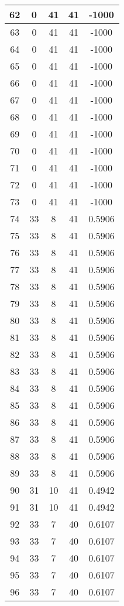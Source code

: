 \documentclass[letterpaper, 12pt]{article}
\begin{document}
\begin{longtable}{|c|c|c|c|c|}
\hline
62 & 0 & 41 & 41 & -1000 \\
\hline
63 & 0 & 41 & 41 & -1000 \\
\hline
64 & 0 & 41 & 41 & -1000 \\
\hline
65 & 0 & 41 & 41 & -1000 \\
\hline
66 & 0 & 41 & 41 & -1000 \\
\hline
67 & 0 & 41 & 41 & -1000 \\
\hline
68 & 0 & 41 & 41 & -1000 \\
\hline
69 & 0 & 41 & 41 & -1000 \\
\hline
70 & 0 & 41 & 41 & -1000 \\
\hline
71 & 0 & 41 & 41 & -1000 \\
\hline
72 & 0 & 41 & 41 & -1000 \\
\hline
73 & 0 & 41 & 41 & -1000 \\
\hline
74 & 33 & 8 & 41 & 0.5906 \\
\hline
75 & 33 & 8 & 41 & 0.5906 \\
\hline
76 & 33 & 8 & 41 & 0.5906 \\
\hline
77 & 33 & 8 & 41 & 0.5906 \\
\hline
78 & 33 & 8 & 41 & 0.5906 \\
\hline
79 & 33 & 8 & 41 & 0.5906 \\
\hline
80 & 33 & 8 & 41 & 0.5906 \\
\hline
81 & 33 & 8 & 41 & 0.5906 \\
\hline
82 & 33 & 8 & 41 & 0.5906 \\
\hline
83 & 33 & 8 & 41 & 0.5906 \\
\hline
84 & 33 & 8 & 41 & 0.5906 \\
\hline
85 & 33 & 8 & 41 & 0.5906 \\
\hline
86 & 33 & 8 & 41 & 0.5906 \\
\hline
87 & 33 & 8 & 41 & 0.5906 \\
\hline
88 & 33 & 8 & 41 & 0.5906 \\
\hline
89 & 33 & 8 & 41 & 0.5906 \\
\hline
90 & 31 & 10 & 41 & 0.4942 \\
\hline
91 & 31 & 10 & 41 & 0.4942 \\
\hline
92 & 33 & 7 & 40 & 0.6107 \\
\hline
93 & 33 & 7 & 40 & 0.6107 \\
\hline
94 & 33 & 7 & 40 & 0.6107 \\
\hline
95 & 33 & 7 & 40 & 0.6107 \\
\hline
96 & 33 & 7 & 40 & 0.6107 \\

\end{longtable}
\end{document}
